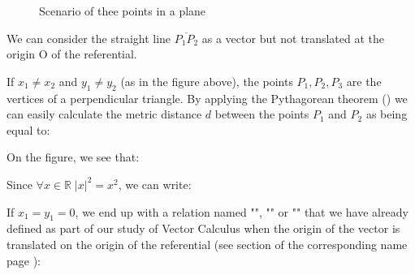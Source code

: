 \begin{figure}[H]
		\vspace*{3mm}
		\caption{Scenario of thee points in a plane}
	\end{figure}
	
	We can consider the straight line $\overline{P_1P_2}$ as a vector but not translated at the origin $\text{O}$ of the referential.
	
	If $x_1\neq x_2$ and $y_1\neq y_2$ (as in the figure above), the points $P_1,P_2,P_3$ are the vertices of a perpendicular triangle. By applying the Pythagorean theorem () we can easily calculate the metric distance $d$ between the points $P_1$ and $P_2$ as being equal to:
	
	On the figure, we see that:
	
	Since $\forall x \in \mathbb{R} \; \vert x \vert ^2 =x^2$, we can write:
	
	If $x_1=y_1=0$, we end up with a relation named "", "" or "" that we have already defined as part of our study of Vector Calculus when the origin of the vector is translated on the origin of the referential (see section of the corresponding name page \pageref{vector norm}):
	

